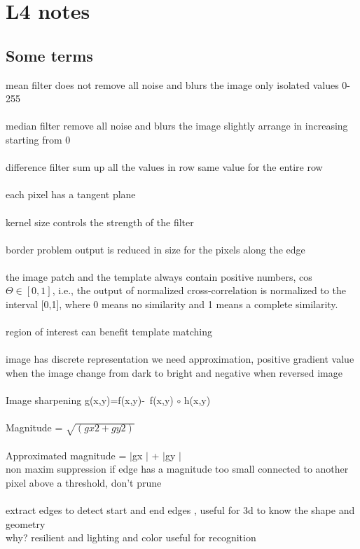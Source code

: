 \documentclass[11pt]{article}
\begin{document}
\section*{L4 notes}
\subsection*{Some terms}
mean filter does not remove all noise and blurs the image
only isolated values 0-255
\\\\
median filter remove all noise and blurs the image slightly
arrange in increasing starting from 0
\\\\
difference filter sum up all the values in row 
same value for the entire row
\\\\
each pixel has a tangent plane
\\\\
kernel size controls the strength of the filter
\\\\
border problem output is reduced in size for the pixels along the edge
\\\\
 the image patch and the template always contain positive numbers, cos $\Theta \in [0, 1]$, i.e., the output of normalized cross-correlation is normalized to the interval [0,1], where 0 means no similarity and 1 means a complete similarity. 
\\\\
region of interest can benefit template matching
\\\\
image has discrete representation we need approximation, positive gradient value when the image change from dark to bright and negative when reversed image
\\\\
Image sharpening g(x,y)=f(x,y)- f(x,y) $\circ $ h(x,y)
\\\\
Magnitude = $\sqrt{(gx2 + gy2 )}$\\\\
Approximated magnitude = $|$gx $|$ + $|$gy $|
$
\\
non maxim suppression
if edge has a magnitude too small connected to another pixel above a threshold, don’t prune 
\\\\
extract edges to detect start and end edges , useful for 3d to know the shape and geometry\\
why? resilient and lighting and color useful for recognition
\\
\\
\end{document}
